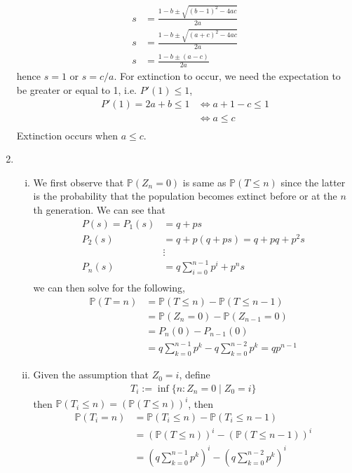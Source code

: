 \documentclass[a4paper,10pt]{article}
\theoremstyle{definition}
\begin{document}
\begin{enumerate}
\begin{align*}
s&=\frac{1-b\pm \sqrt{(b-1)^2-4ac}}{2a}\\
s&=\frac{1-b\pm \sqrt{(a+c)^2-4ac}}{2a}\\
s&=\frac{1-b\pm (a-c)}{2a}
\end{align*}
hence $s=1$ or $s=c/a$. For extinction to occur, we need the expectation to be greater or equal to 1, i.e. $P'(1) \leq 1$,
\begin{align*}
P'(1)=2a+b\leq 1 &\Leftrightarrow a + 1-c \leq 1\\
&\Leftrightarrow a  \leq c\\
\end{align*}
Extinction occurs when $a \leq c$.
\newpage
\item
\begin{enumerate}[(i)]
\item We first observe that $\mathbb{P}(Z_n=0)$ is same as $\mathbb{P}(T \leq n)$  since the latter is the probability that the population becomes extinct before or at the $n$th generation. We can see that
\begin{align*}
P(s)=P_1(s)&=q+ps\\
P_2(s)&=q+p(q+ps)=q + pq +p^2s\\
&\vdots\\
P_n(s)&=q\sum_{i=0}^{n-1}p^i +p^ns\\
\end{align*}
we can then solve for the following,
\begin{align*}
\mathbb{P}(T=n) &= \mathbb{P}(T \leq n)-\mathbb{P}(T \leq n-1)\\
&= \mathbb{P}(Z_{n}=0)-\mathbb{P}(Z_{n-1} = 0)\\
&= P_{n}(0)-P_{n-1}(0)\\
&= q\sum_{k=0}^{n-1}p^k-q\sum_{k=0}^{n-2}p^k = qp^{n-1}
\end{align*}
\item Given the assumption that $Z_0=i$, define
\begin{align*}
T_i:=\inf\{n:Z_n=0\mid Z_0=i\}
\end{align*}
then $\mathbb{P}(T_i\leq n)= (\mathbb{P}(T \leq n))^i$, then
\begin{align*}
\mathbb{P}(T_i= n) &= \mathbb{P}(T_i \leq n)-\mathbb{P}(T_i \leq n-1)\\
&= (\mathbb{P}(T \leq n))^i-(\mathbb{P}(T \leq n-1))^i\\
&= \left(q\sum_{k=0}^{n-1}p^k\right)^i-\left(q\sum_{k=0}^{n-2}p^k\right)^i\\
\end{align*}


\end{enumerate}
\end{enumerate}
\end{document}

